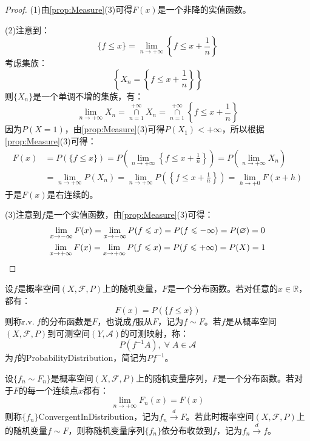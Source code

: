 \begin{proof}
	(1)由\cref{prop:Measure}(3)可得$F(x)$是一个非降的实值函数。\par
	(2)注意到：
	\begin{equation*}
		\{f\leqslant x\}=\lim_{n\to+\infty}\left\{f\leqslant x+\frac{1}{n}\right\}
	\end{equation*}
	考虑集族：
	\begin{equation*}
		\left\{X_n=\left\{f\leqslant x+\frac{1}{n}\right\}\right\}
	\end{equation*}
	则$\{X_n\}$是一个单调不增的集族，有：
	\begin{equation*}
		\lim_{n\to+\infty}X_n=\underset{n=1}{\overset{+\infty}{\cap}}X_n=\underset{n=1}{\overset{+\infty}{\cap}}\left\{f\leqslant x+\frac{1}{n}\right\}
	\end{equation*}
	因为$P(X=1)$，由\cref{prop:Measure}(3)可得$P(X_1)<+\infty$，所以根据\cref{prop:Measure}(3)可得：
	\begin{align*}
		F(x)&=P(\{f\leqslant x\})
		=P\left(\lim_{n\to+\infty}\left\{f\leqslant x+\frac{1}{n}\right\}\right)
		=P\left(\lim_{n\to+\infty}X_n\right) \\
		&=\lim_{n\to+\infty}P(X_n)
		=\lim_{n\to+\infty}P\left(\left\{f\leqslant x+\frac{1}{n}\right\}\right)
		=\lim_{h\to+0}F(x+h)
	\end{align*}
	于是$F(x)$是右连续的。\par
	(3)注意到$f$是一个实值函数，由\cref{prop:Measure}(3)可得：
	\begin{gather*}
		\lim_{x\to-\infty}F(x)=\lim_{x\to-\infty}P(f\leqslant x)=P(f\leqslant-\infty)=P(\varnothing)=0 \\
		\lim_{x\to+\infty}F(x)=\lim_{x\to+\infty}P(f\leqslant x)=P(f\leqslant+\infty)=P(X)=1\qedhere
	\end{gather*}
\end{proof}
\begin{definition}
	设$f$是概率空间$(X,\mathscr{F},P)$上的随机变量，$F$是一个分布函数。若对任意的$x\in\mathbb{R}$，都有：
	\begin{equation*}
		F(x)=P(\{f\leqslant x\})
	\end{equation*}
	则称r.v.$\;f$的分布函数是$F$，也说成$f$服从$F$，记为$f\sim F$。若$f$是从概率空间$(X,\mathscr{F},P)$到可测空间$(Y,\mathscr{A})$的可测映射，称：
	\begin{equation*}
		P(f^{-1}A),\;\forall\;A\in \mathscr{A}
	\end{equation*}
	为$f$的\gls{ProbabilityDistribution}，简记为$Pf^{-1}$。
\end{definition}
\begin{definition}
	设$\{f_n\sim F_n\}$是概率空间$(X,\mathscr{F},P)$上的随机变量序列，$F$是一个分布函数。若对于$F$的每一个连续点$x$都有：
	\begin{equation*}
		\lim_{n\to+\infty}F_n(x)=F(x)
	\end{equation*}
	则称$\{f_n\}$\gls{ConvergentInDistribution}，记为$f_n\overset{d}{\longrightarrow}F$。若此时概率空间$(X,\mathscr{F},P)$上的随机变量$f\sim F$，则称随机变量序列$\{f_n\}$依分布收敛到$f$，记为$f_n\overset{d}{\longrightarrow}f$。
\end{definition}

